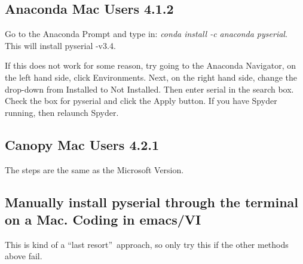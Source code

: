 \subsection{Anaconda Mac Users 4.1.2}

Go to the Anaconda Prompt and type in: \textit{conda install -c anaconda
pyserial}. This will install pyserial -v3.4.


If this does not work for some reason, try going to the Anaconda Navigator,
on the left hand side, click Environments. Next, on the right hand side,
change the drop-down from Installed to Not Installed. Then enter serial in
the search box. Check the box for pyserial and click the Apply button. If
you have Spyder running, then relaunch Spyder.


\subsection{Canopy Mac Users 4.2.1}

The steps are the same as the Microsoft Version.

\subsection{Manually install pyserial through the terminal on a Mac. Coding
in emacs/VI}

This is kind of a \textquotedblleft last resort\textquotedblright\ approach,
so only try this if the other methods above fail.

